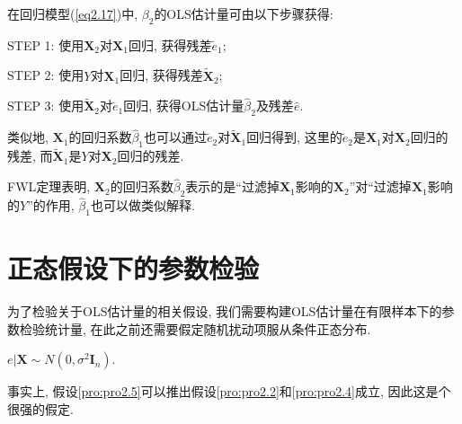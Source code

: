 \documentclass[cn, 12pt, math=mtpro2, bibstyle=apa, blue, twocol]{elegantbook}
\newcommand{\X}{\mathbold{X}}
\newcommand{\hb}{\hat{\beta}}
\begin{document}
\begin{theorem}[FWL定理]
  在回归模型(\ref{eq2.17})中, $\beta_2$的OLS估计量可由以下步骤获得:

  STEP 1: 使用$\X_2$对$\X_1$回归, 获得残差$\tilde{e}_1$;

  STEP 2: 使用$Y$对$\X_1$回归, 获得残差$\tilde{\X}_2$;

  STEP 3: 使用$\tilde{\X}_2$对$\tilde{e}_1$回归, 获得OLS估计量$\hb_2$及残差$\hat{e}$.
\end{theorem}
\begin{remark}
类似地, $\X_1$的回归系数$\hb_1$也可以通过$\tilde{e}_2$对$\tilde{\X}_1$回归得到, 这里的$\tilde{e}_2$是$\X_1$对$\X_2$回归的残差, 而$\tilde{\X}_1$是$Y$对$\X_2$回归的残差.
\end{remark}

FWL定理表明, $\X_2$的回归系数$\hb_2$表示的是“过滤掉$\X_1$影响的$\X_2$”对“过滤掉$\X_1$影响的$Y$”的作用, $\hb_1$也可以做类似解释.

\section{正态假设下的参数检验}
为了检验关于OLS估计量的相关假设, 我们需要构建OLS估计量在有限样本下的参数检验统计量, 在此之前还需要假定随机扰动项服从条件正态分布.
\begin{proposition}[正态扰动项]\label{pro:pro2.5}
$e|\X\sim N(0,\sigma^2\mathbold{I}_n)$.
\end{proposition}

\begin{remark}
事实上, 假设\ref{pro:pro2.5}可以推出假设\ref{pro:pro2.2}和\ref{pro:pro2.4}成立, 因此这是个很强的假定.
\end{remark}
\end{document}
